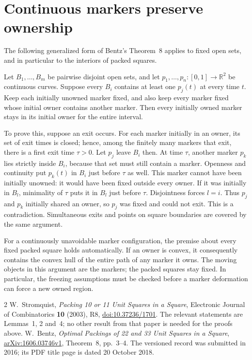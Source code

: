\documentclass[11pt]{article}
\begin{document}
\section*{Continuous markers preserve ownership}
The following generalized form of Bentz's Theorem~8\cite[pp.~3--4]{bentz} applies to
fixed open sets, and in particular to the interiors of packed squares.

Let $B_1,\ldots,B_m$ be pairwise disjoint open sets, and let
$p_1,\ldots,p_n:[0,1]\to\mathbb R^2$ be continuous curves.
Suppose every $B_i$ contains at least one $p_j(t)$ at every time $t$.
Keep each initially unowned marker fixed, and also keep every marker
fixed whose initial owner contains another marker. Then every initially
owned marker stays in its initial owner for the entire interval.

To prove this, suppose an exit occurs. For each marker initially in an
owner, its set of exit times is closed; hence, among the finitely many
markers that exit, there is a first exit time $\tau>0$. Let $p_j$ leave
$B_i$ then. At time $\tau$, another marker $p_k$ lies strictly inside
$B_i$, because that set must still contain a marker. Openness and
continuity put $p_k(t)$ in $B_i$ just before $\tau$ as well.
This marker cannot have been initially unowned: it would have been fixed
outside every owner. If it was initially in $B_l$, minimality of $\tau$
puts it in $B_l$ just before $\tau$. Disjointness forces $l=i$.
Thus $p_j$ and $p_k$ initially shared an owner, so $p_j$ was fixed and
could not exit. This is a contradiction. Simultaneous exits and points
on square boundaries are covered by the same argument.

For a continuously unavoidable marker configuration, the premise about
every fixed packed square holds automatically. If an owner is convex,
it consequently contains the convex hull of the entire path of any
marker it owns. The moving objects in this argument are the markers;
the packed squares stay fixed. In particular, the freezing assumptions
must be checked before a marker deformation can force a new owned region.

\begin{thebibliography}{2}
W.~Stromquist, \emph{Packing 10 or 11 Unit Squares in a Square},
Electronic Journal of Combinatorics \textbf{10} (2003), R8,
\href{https://doi.org/10.37236/1701}{doi:10.37236/1701}.
The relevant statements are Lemmas~1, 2 and~4; no other result from that
paper is needed for the proofs above.
W.~Bentz, \emph{Optimal Packings of 22 and 33 Unit Squares in a Square},
\href{https://arxiv.org/abs/1606.03746v1}{arXiv:1606.03746v1}, Theorem~8,
pp.~3--4. The versioned record was submitted in 2016; its PDF title page
is dated 20 October 2018.
\end{thebibliography}
\end{document}
